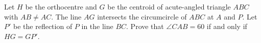 Let $H$ be the orthocentre and $G$ be the centroid of acute-angled triangle $ABC$ with $AB\ne AC$. The line $AG$ intersects the circumcircle of $ABC$ at $A$ and $P$. Let $P'$ be the reflection of $P$ in the line $BC$. Prove that $\angle CAB = 60$ if and only if $HG = GP'$.